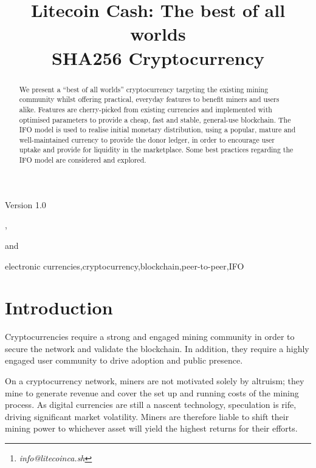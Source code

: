 \documentclass{IOS-Book-Article}
\begin{document}
\begin{frontmatter}              %

\title{Litecoin Cash: The best of all worlds\\
SHA256 Cryptocurrency}
Version 1.0
\author[A]{ %
},
\author[A]{ }
and
\author[A]{ }

\address[A]{The Litecoin Cash Foundation, London.%
\thanks{\textit{info@litecoinca.sh}}}


\begin{abstract}
We present a ``best of all worlds'' cryptocurrency targeting the existing mining community
whilst offering practical, everyday features to benefit miners and users alike. Features are
cherry-picked from existing currencies and implemented with optimised parameters to provide a cheap, fast and stable, general-use blockchain.
The IFO model
is used to realise initial monetary distribution, using a popular, mature and well-maintained currency to provide the donor ledger, in order to encourage user uptake and provide for
liquidity in the marketplace. Some best practices regarding the IFO model are considered and explored.
\end{abstract}

\begin{keyword}
electronic currencies\sep cryptocurrency\sep blockchain\sep peer-to-peer\sep IFO
\end{keyword}
\end{frontmatter}

\thispagestyle{empty}
\pagestyle{empty}

\section*{Introduction}
Cryptocurrencies require a strong and engaged mining community in order to secure the
network and validate the blockchain. In addition, they require a highly engaged user community to drive adoption and public presence.

On a cryptocurrency network, miners are not motivated solely by altruism; they mine to generate revenue
and cover the set up and running costs of the mining process. As digital currencies are still a nascent technology, speculation is rife, driving significant market volatility. Miners are therefore liable
to shift their mining power to whichever asset will yield the highest returns for their efforts.
\end{document}
